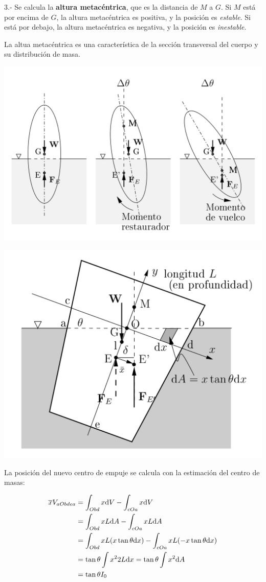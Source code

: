 3.- Se calcula la \textbf{altura metac\'entrica}, que es la distancia de $M$ a $G$. Si $M$ est\'a por encima de $G$, la altura metac\'entrica  es positiva, y la posici\'on es \emph{estable}. Si est\'a por debajo, la altura metac\'entrica es negativa, y la posici\'on es \emph{inestable}.

La altua metac\'entrica es una caracter\'istica de la secci\'on transversal del cuerpo y su distribuci\'on de masa.

\begin{center}
	\includegraphics[width=0.7\linewidth]{TeX_files/chapter02-Hidrostatica/estabilidad4}
\end{center}

\begin{center}
	\includegraphics[width=0.7\linewidth]{TeX_files/chapter02-Hidrostatica/estabilidad5}
\end{center}




	La posici\'on del nuevo centro de empuje se calcula con la estimación del centro de masas:

\begin{align*}
	\overline{x}V_{aObdea} &= \int_{Obd}x \text{d} V - \int_{cOa} x \text{d} V
\\
	&= \int_{Obd} x L \text{d} A - \int_{cOa} x L \text{d} A 
\\
	&= \int_{Obd} x L (x\tan \theta \text{d} x) - \int_{cOa} x L  (-x\tan \theta \text{d} x)
\\
	&= \tan \theta \int x^2 2 L \text{d} x = \tan \theta \int x^2 \text{d} A 
	\\
	&= \tan \theta I_0
\end{align*}


